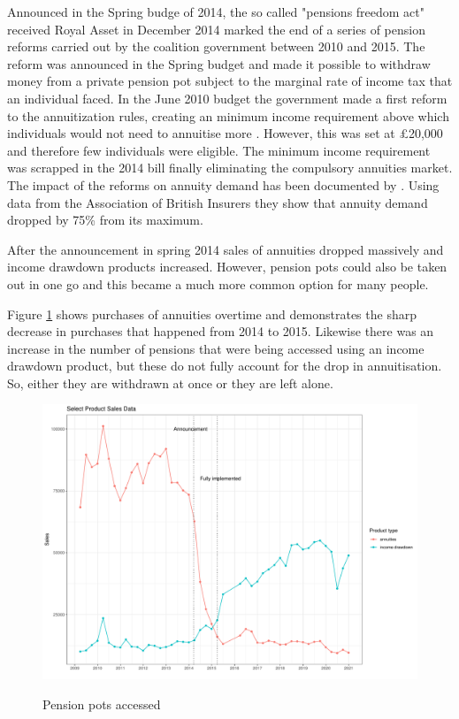 \documentclass[12pt]{article}
\begin{document}
Announced in the Spring budge of 2014, the so called "pensions freedom act" received Royal Asset in December 2014 marked the end of a series
of pension reforms carried out by the coalition government between 2010 and 2015. The reform was announced
in the Spring budget and made it possible to withdraw money from a private pension pot subject to the
marginal rate of income tax that an individual faced. In the June 2010 budget the government made a first
reform to the annuitization rules, creating an minimum income requirement above which individuals would not need to
annuitise more \cite{finance_act_hmt_2011}. However, this was set at £20,000 and therefore few individuals
were eligible. The minimum income requirement was scrapped in the 2014 bill finally eliminating the
compulsory annuities market. The impact of the reforms on annuity demand has been documented by \cite{cannon_et_al_nier_2016}.
Using data from the Association of British Insurers they show that annuity demand dropped by 75\% from
its maximum.

After the announcement in spring 2014 sales of annuities dropped massively and income drawdown products increased.
However, pension pots could also be taken out in one go and this became a much more common option for many people.

Figure \ref{fig:annovertime} shows purchases of annuities overtime and demonstrates the sharp decrease
in purchases that happened from 2014 to 2015. Likewise there was an increase in the number of pensions that were
being accessed using an income drawdown product, but these do not fully account for the drop in annuitisation. So,
either they are withdrawn at once or they are left alone.



\begin{figure}[h]
    \caption{Pension pots accessed}
    \centering
    \includegraphics[width=0.7\columnwidth]{figures/annuity_overtime.pdf}
    \label{fig:annovertime}
\end{figure}
\end{document}
